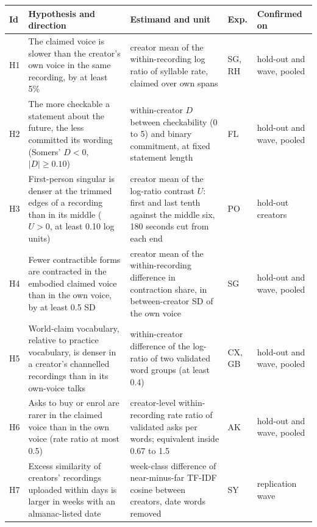 \documentclass[letterpaper]{article} %
\newcommand{\expid}[1]{\textsc{#1}}
\begin{document}
\begin{table}[t]
\centering
\small
\setlength{\tabcolsep}{3pt}
\begin{tabular}{@{}l>{\raggedright\arraybackslash}p{}>{\raggedright\arraybackslash}p{}>{\raggedright\arraybackslash}p{}>{\raggedright\arraybackslash}p{}@{}}
\toprule
Id & Hypothesis and direction & Estimand and unit & Exp. & Confirmed on \\
\midrule
H1 & The claimed voice is slower than the creator's own voice in the same recording, by at least 5\% & creator mean of the within-recording log ratio of syllable rate, claimed over own spans & \expid{SG}, \expid{RH} & hold-out and wave, pooled \\
H2 & The more checkable a statement about the future, the less committed its wording (Somers' $D<0$, $|D|\geq 0.10$) & within-creator $D$ between checkability (0 to 5) and binary commitment, at fixed statement length & \expid{FL} & hold-out and wave, pooled \\
H3 & First-person singular is denser at the trimmed edges of a recording than in its middle ($U>0$, at least 0.10 log units) & creator mean of the log-ratio contrast $U$: first and last tenth against the middle six, 180 seconds cut from each end & \expid{PO} & hold-out creators \\
H4 & Fewer contractible forms are contracted in the embodied claimed voice than in the own voice, by at least 0.5 SD & creator mean of the within-recording difference in contraction share, in between-creator SD of the own voice & \expid{SG} & hold-out and wave, pooled \\
H5 & World-claim vocabulary, relative to practice vocabulary, is denser in a creator's channelled recordings than in its own-voice talks & within-creator difference of the log-ratio of two validated word groups (at least 0.4) & \expid{CX}, \expid{GB} & hold-out and wave, pooled \\
H6 & Asks to buy or enrol are rarer in the claimed voice than in the own voice (rate ratio at most 0.5) & creator-level within-recording rate ratio of validated asks per \RatePerWords{} words; equivalent inside 0.67 to 1.5 & \expid{AK} & hold-out and wave, pooled \\
H7 & Excess similarity of creators' recordings uploaded within \SyNearDays{} days is larger in weeks with an almanac-listed date & week-class difference of near-minus-far TF-IDF cosine between creators, date words removed & \expid{SY} & replication wave \\

\end{tabular}
\end{table}
\end{document}
